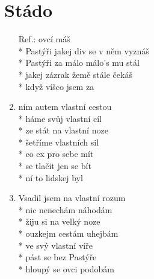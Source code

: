 \section{Stádo}
\begin{enumerate}
\item[Ref.:]   ovcí máš \\*
Pastýři jakej div  se v něm vyznáš \\*
Pastýři za málo  málo's mu stál \\*
jakej zázrak žemě stále čekáš \\*
když víšco jsem za 
\item {}ním autem vlastní cestou \\*
háme svůj vlastní cíl \\*
ze stát na vlastní noze \\*
šetříme vlastních sil \\*
co ex pro sebe mít \\*
 se tlačit jen se bít \\*
ní to lidskej  byl 
\item Vsadil jsem na vlastní rozum \\*
nic nenechám náhodám \\*
žiju si na velký noze \\*
ouzkejm cestám uhejbám \\*
ve svý vlastní víře \\*
pást se bez Pastýře \\*
hloupý se ovci podobám
\end{enumerate}
